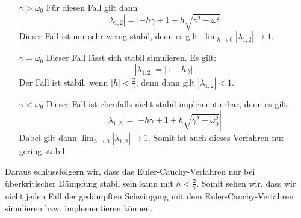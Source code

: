 \documentclass[ngerman]{scrartcl}
\begin{document}
\begin{itemize}
 	\item[$\gamma > \omega_0$] Für diesen Fall gilt dann  \begin{equation*}  |\lambda_{1,2}| = |-h\gamma + 1 \pm h\sqrt{\gamma^2-\omega_0^2}  \end{equation*}  Dieser Fall ist nur sehr wenig stabil, denn es gilt: $\lim_{h \to 0} |\lambda_{1,2}| \rightarrow 1$.
	\item[$\gamma = \omega_0$] Dieser Fall lässt sich stabil simulieren. Es gilt:  \begin{equation*}  |\lambda_{1,2}| = | 1 - h\gamma|  \end{equation*}  Der Fall ist stabil, wenn $|h| < \frac{2}{\gamma}$, denn dann gilt $|\lambda_{1,2}| < 1$.
	\item[$\gamma < \omega_0$] Dieser Fall ist ebenfalls nicht stabil implementierbar, denn es gilt:  \begin{equation*}  |\lambda_{1,2}| = |-h\gamma + 1 \pm h\sqrt{\gamma^2 - \omega_0^2}|  \end{equation*}  Dabei gilt dann $\lim_{h \to 0} |\lambda_{1,2}| \rightarrow 1$. Somit ist auch dieses Verfahren nur gering stabil.
\end{itemize}
Daraus schlussfolgern wir, dass das Euler-Cauchy-Verfahren nur bei überkritischer Dämpfung stabil sein kann mit $h<\frac{2}{\gamma}$. Somit sehen wir, dass wir nicht jeden Fall der gedämpften Schwingung mit dem Euler-Cauchy-Verfahren simulieren bzw. implementieren können.
\end{document}
